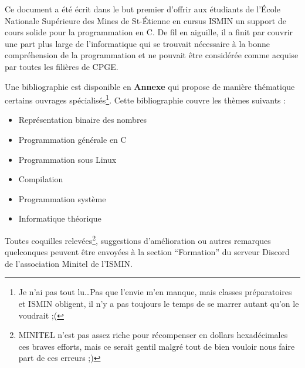 \documentclass[../main.tex]{subfiles}
\begin{document}
Ce document a été écrit dans le but premier d'offrir aux étudiants de l'École Nationale Supérieure des
Mines de St-Étienne en cursus ISMIN un support de cours solide pour la programmation en C. De fil
en aiguille, il a finit par couvrir une part plus large de l'informatique qui se trouvait nécessaire à la
bonne compréhension de la programmation et ne pouvait être considérée comme acquise par toutes les
filières de CPGE.

Une bibliographie est disponible en \textbf{Annexe} qui propose de manière thématique certains ouvrages spécialisés\footnote{Je n'ai pas tout lu\dots Pas que l'envie m'en manque, mais classes préparatoires et ISMIN obligent, il n'y a pas toujours le temps de se marrer autant qu'on le voudrait ;(}. Cette bibliographie couvre les thèmes suivants :
\begin{itemize}
	\item Représentation binaire des nombres \cite{MullerEtAl2018}\cite{BitHacks}
	\item Programmation générale en C \cite{KR}\cite{c11}
	\item Programmation sous Linux \cite{LPI}
	\item Compilation \cite{gnumake}\cite{LL}\cite{AL}\cite{Aho}
	\item Programmation système \cite{CSaPP}
	\item Informatique théorique \cite{XFI}
\end{itemize}

Toutes coquilles relevées\footnote{MINITEL n'est pas assez riche pour récompenser en dollars hexadécimales ces braves efforts, mais ce serait gentil malgré tout de bien vouloir nous faire part de ces erreurs ;)}, suggestions d'amélioration ou autres remarques quelconques peuvent être envoyées à la section ``Formation'' du serveur Discord de l'association Minitel de l'ISMIN.

\hrulefill
\newpage
\end{document}
